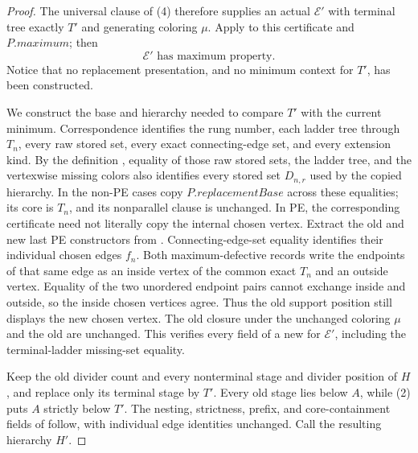 \begin{proof}
The universal clause of (4) therefore supplies an actual
 \(\mathcal E'\) with
terminal tree exactly \(T'\) and generating coloring \(\mu\).  Apply
 to this certificate and
\(P.\mathit{maximum}\); then
\[
                 \mathcal E'\text{ has maximum property}.    \tag{5}
\]
Notice that no replacement presentation, and no minimum context for
\(T'\), has been constructed.

We construct the base and hierarchy needed to compare \(T'\) with the
current minimum.  Correspondence identifies the rung number, each ladder
tree through \(T_n\), every raw stored set, every exact connecting-edge
set, and every extension kind.  By the definition
, equality of those raw stored sets, the
ladder tree, and the vertexwise missing colors also identifies every stored
set \(D_{n,r}\) used by the copied hierarchy.  In the non-PE cases copy
\(P.\mathit{replacementBase}\) across these equalities; its core is
\(T_n\), and its nonparallel clause is unchanged.  In PE, the
corresponding certificate need not literally copy the internal chosen
vertex.  Extract the old and new last PE constructors from
.  Connecting-edge-set equality identifies
their individual chosen edges \(f_n\).  Both maximum-defective records
write the endpoints of that same edge as an inside vertex of the common
exact \(T_n\) and an outside vertex.  Equality of the two unordered
endpoint pairs cannot exchange inside and outside, so the inside chosen
vertices agree.  Thus the old support position still displays the new
chosen vertex.  The old closure under the unchanged coloring \(\mu\) and
the old  are unchanged.  This verifies every
field of a new  for \(\mathcal E'\), including the
terminal-ladder missing-set equality.

Keep the old divider count and every nonterminal stage and divider
position of \(H\), and replace only its terminal stage by \(T'\).  Every
old stage lies below \(A\), while (2) puts \(A\) strictly below \(T'\).
The nesting, strictness, prefix, and core-containment fields of
 follow, with individual edge identities
unchanged.  Call the resulting hierarchy \(H'\).


\end{proof}
